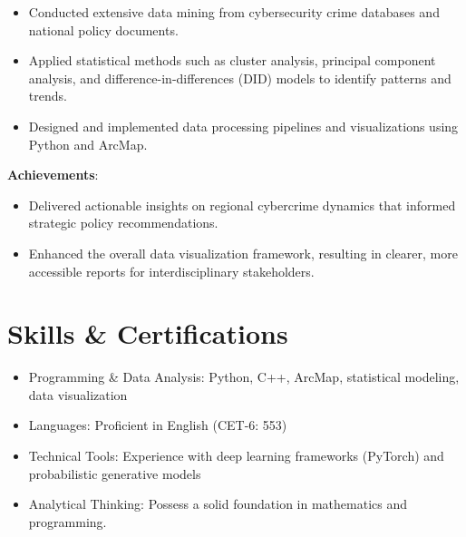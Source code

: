 \documentclass{article}
\begin{document}
\begin{itemize}[leftmargin=1.5em]
    \item Conducted extensive data mining from cybersecurity crime databases and national policy documents.
    \item Applied statistical methods such as cluster analysis, principal component analysis, and difference-in-differences (DID) models to identify patterns and trends.
    \item Designed and implemented data processing pipelines and visualizations using Python and ArcMap.
\end{itemize}

\textbf{Achievements}:
\begin{itemize}[leftmargin=1.5em]
    \item Delivered actionable insights on regional cybercrime dynamics that informed strategic policy recommendations.
    \item Enhanced the overall data visualization framework, resulting in clearer, more accessible reports for interdisciplinary stakeholders.
\end{itemize}

\section{Skills \& Certifications}
\begin{itemize}[leftmargin=1.5em]
    \item Programming \& Data Analysis: Python, C++, ArcMap, statistical modeling, data visualization
    \item Languages: Proficient in English (CET-6: 553)
    \item Technical Tools: Experience with deep learning frameworks (PyTorch) and probabilistic generative models
    \item Analytical Thinking: Possess a solid foundation in mathematics and programming.
\end{itemize}
\end{document}
